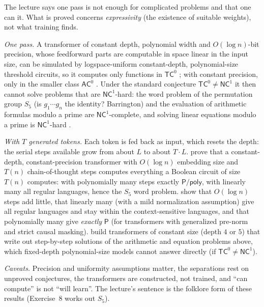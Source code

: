 \begin{beyond}\label{box:L6-cot}
The lecture says one pass is not enough for complicated problems and that one can  it. What is proved concerns \emph{expressivity} (the existence of suitable weights), not what training finds.

\emph{One pass.} A transformer of constant depth, polynomial width and $O(\log n)$-bit precision, whose feedforward parts are computable in space linear in the input size, can be simulated by logspace-uniform constant-depth, polynomial-size threshold circuits, so it computes only functions in $\mathsf{TC}^0$ \citep{merrill2023}; with constant precision, only in the smaller class $\mathsf{AC}^0$ \citep{li2024cot}. Under the standard conjecture $\mathsf{TC}^0\neq\mathsf{NC}^1$ it then cannot solve problems that are $\mathsf{NC}^1$-hard: the word problem of the permutation group $S_5$ (is $g_1\cdots g_n$ the identity? Barrington) and the evaluation of arithmetic formulas modulo a prime are $\mathsf{NC}^1$-complete, and solving linear equations modulo a prime is $\mathsf{NC}^1$-hard \citep{feng2023,li2024cot}.

\emph{With $T$ generated tokens.} Each token is fed back as input, which resets the depth: the serial steps available grow from about $L$ to about $T\cdot L$. \citet{li2024cot} prove that a constant-depth, constant-precision transformer with $O(\log n)$ embedding size and $T(n)$ chain-of-thought steps computes everything a Boolean circuit of size $T(n)$ computes: with polynomially many steps exactly $\mathsf{P/poly}$, with linearly many all regular languages, hence the $S_5$ word problem. \citet{merrill2024cot} show that $O(\log n)$ steps add little, that linearly many (with a mild normalization assumption) give all regular languages and stay within the context-sensitive languages, and that polynomially many give \emph{exactly} $\mathsf P$ (for transformers with generalized pre-norm and strict causal masking). \citet{feng2023} build transformers of constant size (depth $4$ or $5$) that write out step-by-step solutions of the arithmetic and equation problems above, which fixed-depth polynomial-size models cannot answer directly (if $\mathsf{TC}^0\neq\mathsf{NC}^1$).

\emph{Caveats.} Precision and uniformity assumptions matter, the separations rest on unproved conjectures, the transformers are constructed, not trained, and ``can compute'' is not ``will learn''. The lecture's sentence is the folklore form of these results (Exercise~8 works out $S_5$).
\end{beyond}

